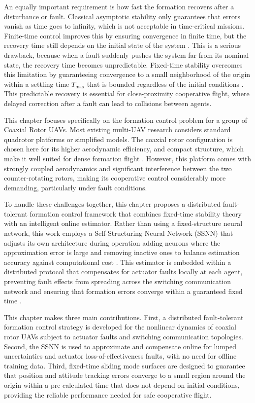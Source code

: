 An equally important requirement is how fast the formation
recovers after a disturbance or fault. Classical asymptotic stability only
guarantees that errors vanish as time goes to infinity, which is not acceptable
in time-critical missions. Finite-time control improves this by ensuring
convergence in finite time, but the recovery time still depends on the initial
state of the system \cite{Bhat2000, fxt}. This is a serious drawback, because
when a fault suddenly pushes the system far from its nominal state, the recovery
time becomes unpredictable. Fixed-time stability overcomes this limitation by
guaranteeing convergence to a small neighborhood of the origin within a settling
time $T_{\max}$ that is bounded regardless of the initial conditions
\cite{Polyakov2012, Parsegov2013}. This predictable recovery is essential for
close-proximity cooperative flight, where delayed correction after a fault can
lead to collisions between agents.

This chapter focuses specifically on the formation control problem for a group
of Coaxial Rotor UAVs. Most existing multi-UAV research considers standard
quadrotor platforms or simplified models. The coaxial rotor configuration is
chosen here for its higher aerodynamic efficiency, and compact structure, which make it well suited for dense formation
flight \cite{coaxial_review1, Coaxial_Ref2, MFC3, Backstepping_Ref}. However, this platform comes with
strongly coupled aerodynamics and significant interference between the two
counter-rotating rotors, making its cooperative control considerably more
demanding, particularly under fault conditions.

To handle these challenges together, this chapter proposes a distributed
fault-tolerant formation control framework that combines fixed-time stability
theory with an intelligent online estimator. Rather than using a fixed-structure
neural network, this work employs a Self-Structuring Neural Network (SSNN) that
adjusts its own architecture during operation  adding neurons where the
approximation error is large and removing inactive ones  to balance estimation
accuracy against computational cost \cite{SSNN1, SSNN_Ref2}. This estimator is
embedded within a distributed protocol that compensates for actuator
faults locally at each agent, preventing fault effects from spreading across
the switching communication network and ensuring that formation errors converge
within a guaranteed fixed time \cite{FixedTime_Formation, Fixed_Time_Formation_2023}.

This chapter makes three main contributions. First, a distributed
fault-tolerant formation control strategy is developed for the nonlinear dynamics
of coaxial rotor UAVs subject to actuator faults and switching communication
topologies. Second, the SSNN is used to approximate and compensate online for
lumped uncertainties and actuator loss-of-effectiveness faults, with no need
for offline training data. Third, fixed-time sliding mode surfaces are designed
to guarantee that position and attitude tracking errors converge to a small
region around the origin within a pre-calculated time that does not depend on
initial conditions, providing the reliable performance needed for safe
cooperative flight.

